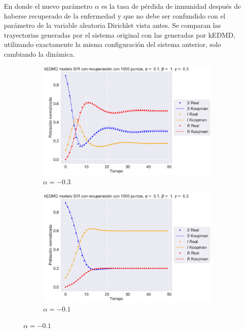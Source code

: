 En donde el nuevo parámetro $\alpha$ es la tasa de pérdida de inmunidad después de haberse recuperado de la enfermedad y que no debe ser confundido con el parámetro de la variable aleatoria Dirichlet vista antes.
Se comparan las trayectorias generadas por el sistema original con las generadas por kEDMD, utilizando exactamente la misma configuración del sistema anterior, solo cambiando la dinámica.
\begin{figure}[htbp]
    \centering
    \begin{subfigure}[b]{0.45\textwidth}
        \centering
        \includegraphics[width=\textwidth]{img/content/chapter3/SIR_rec1.pdf}
        \caption{$\alpha=-0.3$}
        \label{fig:image1}
    \end{subfigure}
    \hfill
    \begin{subfigure}[b]{0.45\textwidth}
        \centering
        \includegraphics[width=\textwidth]{img/content/chapter3/SIR_rec2.pdf}
        \caption{$\alpha=-0.1$}

\end{subfigure}
\end{figure}
